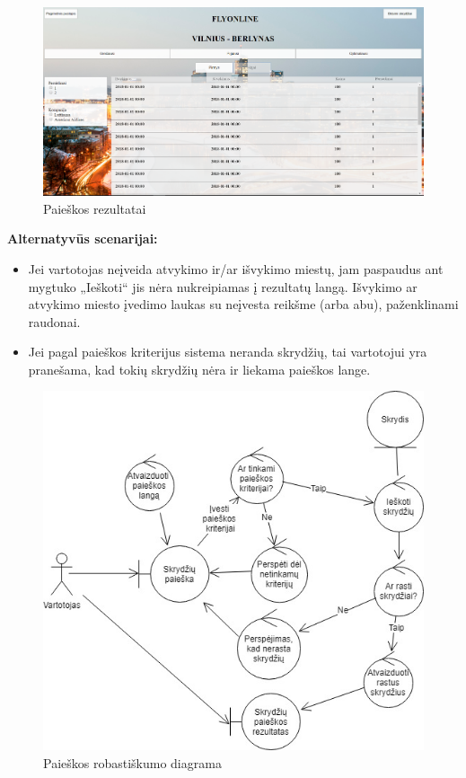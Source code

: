 \documentclass{VUMIFPSkursinis}
\begin{document}
\begin{enumerate}[label=\textbf{U\arabic*}.]
                    \begin{figure}[H]
                        \centering
                        \includegraphics[scale=0.4]{img/search_one_way}
                        \caption{Paieškos rezultatai}
                        \label{results_one_way}
                    \end{figure}
                    \newpage\textbf{Alternatyvūs scenarijai:}
                    \begin{itemize}
                        \item Jei vartotojas neįveida atvykimo ir/ar išvykimo miestų, jam paspaudus ant mygtuko „Ieškoti“ jis nėra nukreipiamas į rezultatų langą. Išvykimo ar atvykimo miesto įvedimo laukas su neįvesta reikšme (arba abu), paženklinami raudonai.
                        \item Jei pagal paieškos kriterijus sistema neranda skrydžių, tai vartotojui yra pranešama, kad tokių skrydžių nėra ir liekama paieškos lange.
                    \end{itemize}

                    \begin{figure}[H]
                        \centering
                        \includegraphics[scale=0.8]{img/ROBsearch}
                        \caption{Paieškos robastiškumo diagrama}
                        \label{home_page_one_way}
                    \end{figure}


\end{enumerate}
\end{document}
